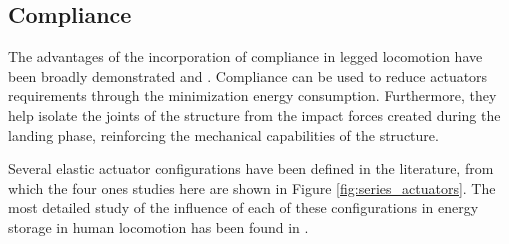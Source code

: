 
\subsection{Compliance} %
\label{sub:compliance}
The advantages of the incorporation of compliance in legged locomotion have been broadly demonstrated \cite{compliance_thesis} and \cite{grimmer}.
Compliance can be used to reduce actuators requirements through the minimization energy consumption.
Furthermore, they help isolate the joints of the structure from the impact forces created during the landing phase, reinforcing the mechanical capabilities of the structure.

Several elastic actuator configurations have been defined in the literature, from which the four ones studies here are shown in Figure \ref{fig:series_actuators}.
The most detailed study of the influence of each of these configurations in energy storage in human locomotion has been found in \cite{grimmer}.


